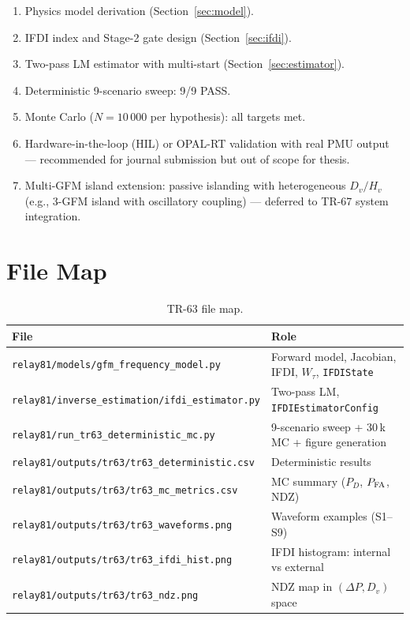 \documentclass[11pt, a4paper]{article}
\newcommand{\Wtau}{W_\tau}
\begin{document}
\begin{enumerate}
  \item[$\checkmark$] Physics model derivation (Section~\ref{sec:model}).
  \item[$\checkmark$] IFDI index and Stage-2 gate design (Section~\ref{sec:ifdi}).
  \item[$\checkmark$] Two-pass LM estimator with multi-start (Section~\ref{sec:estimator}).
  \item[$\checkmark$] Deterministic 9-scenario sweep: 9/9 PASS.
  \item[$\checkmark$] Monte Carlo ($N = 10\,000$ per hypothesis): all targets met.
  \item[$\square$] Hardware-in-the-loop (HIL) or OPAL-RT validation with
    real PMU output — recommended for journal submission but out of scope
    for thesis.
  \item[$\square$] Multi-GFM island extension: passive islanding with
    heterogeneous $D_v/H_v$ (e.g., 3-GFM island with oscillatory coupling)
    — deferred to TR-67 system integration.
\end{enumerate}


\section{File Map}
\label{sec:filemap}

\begin{table}[h]
\centering
\caption{TR-63 file map.}
\label{tab:filemap}
\begin{tabular}{p{}p{}}
\toprule
File & Role \\
\midrule
\texttt{relay81/models/gfm\_frequency\_model.py}
  & Forward model, Jacobian, IFDI, $\Wtau$, \texttt{IFDIState} \\
\texttt{relay81/inverse\_estimation/ifdi\_estimator.py}
  & Two-pass LM, \texttt{IFDIEstimatorConfig} \\
\texttt{relay81/run\_tr63\_deterministic\_mc.py}
  & 9-scenario sweep + 30\,k MC + figure generation \\
\texttt{relay81/outputs/tr63/tr63\_deterministic.csv}
  & Deterministic results \\
\texttt{relay81/outputs/tr63/tr63\_mc\_metrics.csv}
  & MC summary ($P_D$, $P_{\rm FA}$, NDZ) \\
\texttt{relay81/outputs/tr63/tr63\_waveforms.png}
  & Waveform examples (S1--S9) \\
\texttt{relay81/outputs/tr63/tr63\_ifdi\_hist.png}
  & IFDI histogram: internal vs external \\
\texttt{relay81/outputs/tr63/tr63\_ndz.png}
  & NDZ map in $(\Delta P, D_v)$ space \\
\bottomrule
\end{tabular}
\end{table}
\end{document}
